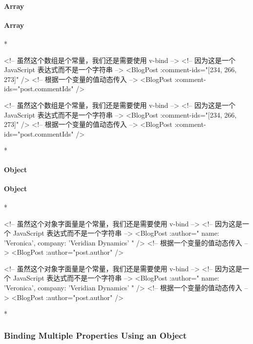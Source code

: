 \begin{paracol}{2}
\paragraph{Array}
\switchcolumn
\paragraph{Array}
\switchcolumn[0]*%
\begin{codeHtml}
<!-- 虽然这个数组是个常量，我们还是需要使用 v-bind -->
<!-- 因为这是一个 JavaScript 表达式而不是一个字符串 -->
<BlogPost :comment-ids="[234, 266, 273]" />
<!-- 根据一个变量的值动态传入 -->
<BlogPost :comment-ids="post.commentIds" />
\end{codeHtml}
\switchcolumn
\begin{codeHtml}
<!-- 虽然这个数组是个常量，我们还是需要使用 v-bind -->
<!-- 因为这是一个 JavaScript 表达式而不是一个字符串 -->
<BlogPost :comment-ids="[234, 266, 273]" />
<!-- 根据一个变量的值动态传入 -->
<BlogPost :comment-ids="post.commentIds" />
\end{codeHtml}
\switchcolumn[0]*%
\paragraph{Object}
\switchcolumn
\paragraph{Object}

\switchcolumn[0]*%
\begin{codeHtml}
<!-- 虽然这个对象字面量是个常量，我们还是需要使用 v-bind -->
<!-- 因为这是一个 JavaScript 表达式而不是一个字符串 -->
<BlogPost
  :author="{
    name: 'Veronica',
    company: 'Veridian Dynamics'
  }"
 />
<!-- 根据一个变量的值动态传入 -->
<BlogPost :author="post.author" />
\end{codeHtml}
\switchcolumn
\begin{codeHtml}
<!-- 虽然这个对象字面量是个常量，我们还是需要使用 v-bind -->
<!-- 因为这是一个 JavaScript 表达式而不是一个字符串 -->
<BlogPost
  :author="{
    name: 'Veronica',
    company: 'Veridian Dynamics'
  }"
 />
<!-- 根据一个变量的值动态传入 -->
<BlogPost :author="post.author" />
\end{codeHtml}
\switchcolumn[0]*%
\subsubsection{Binding Multiple Properties Using an Object}
\switchcolumn

\end{paracol}
